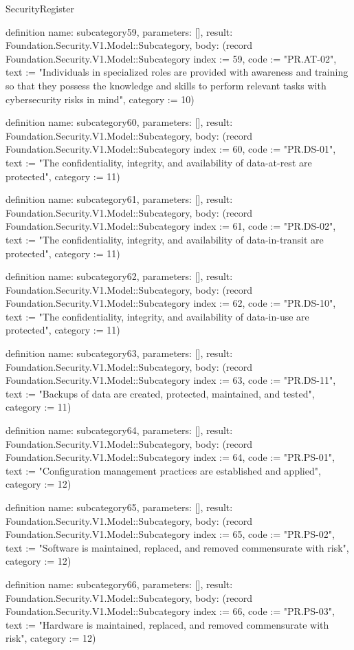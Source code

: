 \begin{lexlean}{SecurityRegister}
\begin{semanticmodule}
definition{
  name: subcategory59,
  parameters: [],
  result: Foundation.Security.V1.Model::Subcategory,
  body: (record Foundation.Security.V1.Model::Subcategory {index := 59, code := "PR.AT-02", text := "Individuals in specialized roles are provided with awareness and training so that they possess the knowledge and skills to perform relevant tasks with cybersecurity risks in mind", category := 10})
}

definition{
  name: subcategory60,
  parameters: [],
  result: Foundation.Security.V1.Model::Subcategory,
  body: (record Foundation.Security.V1.Model::Subcategory {index := 60, code := "PR.DS-01", text := "The confidentiality, integrity, and availability of data-at-rest are protected", category := 11})
}

definition{
  name: subcategory61,
  parameters: [],
  result: Foundation.Security.V1.Model::Subcategory,
  body: (record Foundation.Security.V1.Model::Subcategory {index := 61, code := "PR.DS-02", text := "The confidentiality, integrity, and availability of data-in-transit are protected", category := 11})
}

definition{
  name: subcategory62,
  parameters: [],
  result: Foundation.Security.V1.Model::Subcategory,
  body: (record Foundation.Security.V1.Model::Subcategory {index := 62, code := "PR.DS-10", text := "The confidentiality, integrity, and availability of data-in-use are protected", category := 11})
}

definition{
  name: subcategory63,
  parameters: [],
  result: Foundation.Security.V1.Model::Subcategory,
  body: (record Foundation.Security.V1.Model::Subcategory {index := 63, code := "PR.DS-11", text := "Backups of data are created, protected, maintained, and tested", category := 11})
}

definition{
  name: subcategory64,
  parameters: [],
  result: Foundation.Security.V1.Model::Subcategory,
  body: (record Foundation.Security.V1.Model::Subcategory {index := 64, code := "PR.PS-01", text := "Configuration management practices are established and applied", category := 12})
}

definition{
  name: subcategory65,
  parameters: [],
  result: Foundation.Security.V1.Model::Subcategory,
  body: (record Foundation.Security.V1.Model::Subcategory {index := 65, code := "PR.PS-02", text := "Software is maintained, replaced, and removed commensurate with risk", category := 12})
}

definition{
  name: subcategory66,
  parameters: [],
  result: Foundation.Security.V1.Model::Subcategory,
  body: (record Foundation.Security.V1.Model::Subcategory {index := 66, code := "PR.PS-03", text := "Hardware is maintained, replaced, and removed commensurate with risk", category := 12})
}


\end{semanticmodule}
\end{lexlean}
